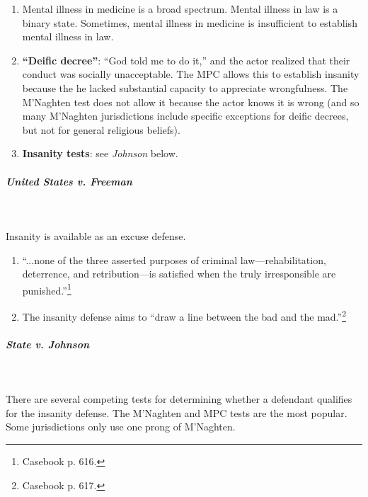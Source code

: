 \begin{enumerate}
    \item Mental illness in medicine is a broad spectrum. Mental illness in 
    law is a binary state. Sometimes, mental illness in medicine is 
    insufficient to establish mental illness in law.
    \item \textbf{``Deific decree''}: ``God told me to do it,'' and the actor 
    realized that their conduct was socially unacceptable. The MPC allows 
    this to establish insanity because the he lacked substantial capacity to 
    appreciate wrongfulness. The M'Naghten test does not allow it because the 
    actor knows it is wrong (and so many M'Naghten jurisdictions include 
    specific exceptions for deific decrees, but not for general religious 
    beliefs).
    \item \textbf{Insanity tests}: see \emph{Johnson} below.
\end{enumerate}

\paragraph{\emph{United States v. Freeman}}
~\\\\
Insanity is available as an excuse defense.

\begin{enumerate}
    \item ``...none of the three asserted purposes of criminal 
    law---rehabilitation, deterrence, and retribution---is satisfied when the 
    truly irresponsible are punished.''\footnote{Casebook p. 616.}
    \item The insanity defense aims to ``draw a line between the bad and the 
    mad.''\footnote{Casebook p. 617.}
\end{enumerate}

\paragraph{\emph{State v. Johnson}}
~\\\\
There are several competing tests for determining whether a defendant 
qualifies for the insanity defense. The M'Naghten and MPC tests are the most 
popular. Some jurisdictions only use one prong of M'Naghten.

